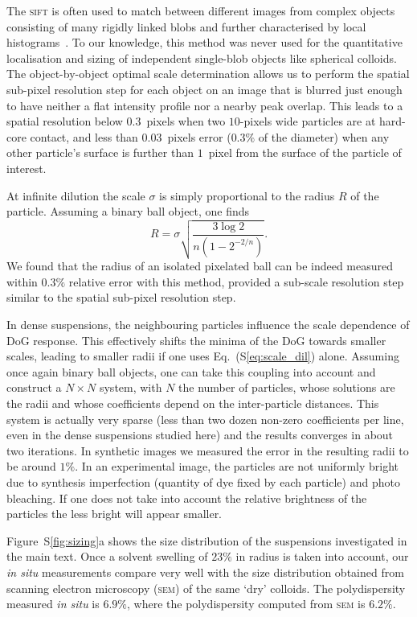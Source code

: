 \documentclass[prl,twocolumn,notitlepage]{revtex4-1}
\begin{document}
The \textsc{sift} is often used to match between different images from complex objects consisting of many rigidly linked blobs and further characterised by local histograms~\citep{Lowe2004}. To our knowledge, this method was never used for the quantitative localisation and sizing of independent single-blob objects like spherical colloids. The object-by-object optimal scale determination allows us to perform the spatial sub-pixel resolution step for each object on an image that is blurred just enough to have neither a flat intensity profile nor a nearby peak overlap. This leads to a spatial resolution below $0.3$~pixels when two $10$-pixels wide particles are at hard-core contact, and less than $0.03$~pixels error ($0.3\%$ of the diameter) when any other particle's surface is further than $1$~pixel from the surface of the particle of interest.

At infinite dilution the scale $\sigma$ is simply proportional to the radius $R$ of the particle. Assuming a binary ball object, one finds
\begin{equation}
	R = \sigma \sqrt{\frac{3 \log 2}{n(1-2^{-2/n})}}. 
	\label{eq:scale_dil}
\end{equation}
We found that the radius of an isolated pixelated ball can be indeed measured within $0.3\%$ relative error with this method, provided a sub-scale resolution step similar to the spatial sub-pixel resolution step.

In dense suspensions, the neighbouring particles influence the scale dependence of DoG response. This effectively shifts the minima of the DoG towards smaller scales, leading to smaller radii if one uses Eq.~(S\ref{eq:scale_dil}) alone. Assuming once again binary ball objects, one can take this coupling into account and construct a $N\times N$ system, with $N$ the number of particles, whose solutions are the radii and whose coefficients depend on the inter-particle distances. This system is actually very sparse (less than two dozen non-zero coefficients per line, even in the dense suspensions studied here) and the results converges in about two iterations. In synthetic images we measured the error in the resulting radii to be around $1\%$. In an experimental image, the particles are not uniformly bright due to synthesis imperfection (quantity of dye fixed by each particle) and photo bleaching. If one does not take into account the relative brightness of the particles the less bright will appear smaller.

Figure~S\ref{fig:sizing}a shows the size distribution of the suspensions investigated in the main text. Once a solvent swelling of $23\%$ in radius is taken into account, our \emph{in situ} measurements compare very well with the size distribution obtained from scanning electron microscopy (\textsc{sem}) of the same `dry' colloids. The polydispersity measured \emph{in situ} is $6.9\%$, where the polydispersity computed from \textsc{sem} is $6.2\%$.
\end{document}

